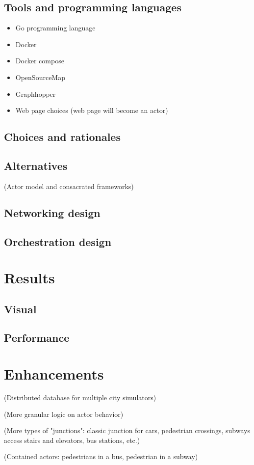 \documentclass[conference]{IEEEtran}
\begin{document}
\subsection{Tools and programming languages}
\begin{itemize}
\item Go programming language
\item Docker
\item Docker compose
\item OpenSourceMap
\item Graphhopper
\item Web page choices (web page will become an actor)
\end{itemize}

\subsection{Choices and rationales}

\subsection{Alternatives}
(Actor model and consacrated frameworks)

\subsection{Networking design}

\subsection{Orchestration design}

\section{Results}

\subsection{Visual}

\subsection{Performance}

\section{Enhancements}
(Distributed database for multiple city simulators)

(More granular logic on actor behavior)

(More types of "junctions": classic junction for cars, pedestrian crossings, subways access stairs and elevators, bus stations, etc.)

(Contained actors: pedestrians in a bus, pedestrian in a subway)


\vspace{12pt}
\end{document}
